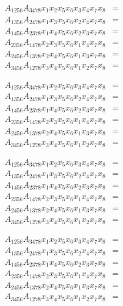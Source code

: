 \documentclass[aps, preprint]{revtex4}
\begin{document}
\begin{enumerate}
\begin{align}A_{1 2 5 6} A_{3 4 7 8} x_{1} x_{2} x_{5} x_{6} x_{3} x_{4} x_{7} x_{8} &  = \\
A_{1 3 5 6} A_{2 4 7 8} x_{1} x_{3} x_{5} x_{6} x_{2} x_{4} x_{7} x_{8} &  = \\
A_{1 4 5 6} A_{2 3 7 8} x_{1} x_{4} x_{5} x_{6} x_{2} x_{3} x_{7} x_{8} &  = \\
A_{2 3 5 6} A_{1 4 7 8} x_{2} x_{3} x_{5} x_{6} x_{1} x_{4} x_{7} x_{8} &  = \\
A_{2 4 5 6} A_{1 3 7 8} x_{2} x_{4} x_{5} x_{6} x_{1} x_{3} x_{7} x_{8} &  = \\
A_{3 4 5 6} A_{1 2 7 8} x_{3} x_{4} x_{5} x_{6} x_{1} x_{2} x_{7} x_{8} &  =\end{align}


\begin{align}A_{1 2 5 6} A_{3 4 7 8} x_{1} x_{2} x_{5} x_{6} x_{3} x_{4} x_{7} x_{8} &  = \\
A_{1 3 5 6} A_{2 4 7 8} x_{1} x_{3} x_{5} x_{6} x_{2} x_{4} x_{7} x_{8} &  = \\
A_{1 4 5 6} A_{2 3 7 8} x_{1} x_{4} x_{5} x_{6} x_{2} x_{3} x_{7} x_{8} &  = \\
A_{2 3 5 6} A_{1 4 7 8} x_{2} x_{3} x_{5} x_{6} x_{1} x_{4} x_{7} x_{8} &  = \\
A_{2 4 5 6} A_{1 3 7 8} x_{2} x_{4} x_{5} x_{6} x_{1} x_{3} x_{7} x_{8} &  = \\
A_{3 4 5 6} A_{1 2 7 8} x_{3} x_{4} x_{5} x_{6} x_{1} x_{2} x_{7} x_{8} &  =\end{align}


\begin{align}A_{1 2 5 6} A_{3 4 7 8} x_{1} x_{2} x_{5} x_{6} x_{3} x_{4} x_{7} x_{8} &  = \\
A_{1 3 5 6} A_{2 4 7 8} x_{1} x_{3} x_{5} x_{6} x_{2} x_{4} x_{7} x_{8} &  = \\
A_{1 4 5 6} A_{2 3 7 8} x_{1} x_{4} x_{5} x_{6} x_{2} x_{3} x_{7} x_{8} &  = \\
A_{2 3 5 6} A_{1 4 7 8} x_{2} x_{3} x_{5} x_{6} x_{1} x_{4} x_{7} x_{8} &  = \\
A_{2 4 5 6} A_{1 3 7 8} x_{2} x_{4} x_{5} x_{6} x_{1} x_{3} x_{7} x_{8} &  = \\
A_{3 4 5 6} A_{1 2 7 8} x_{3} x_{4} x_{5} x_{6} x_{1} x_{2} x_{7} x_{8} &  =\end{align}


\begin{align}A_{1 2 5 6} A_{3 4 7 8} x_{1} x_{2} x_{5} x_{6} x_{3} x_{4} x_{7} x_{8} &  = \\
A_{1 3 5 6} A_{2 4 7 8} x_{1} x_{3} x_{5} x_{6} x_{2} x_{4} x_{7} x_{8} &  = \\
A_{1 4 5 6} A_{2 3 7 8} x_{1} x_{4} x_{5} x_{6} x_{2} x_{3} x_{7} x_{8} &  = \\
A_{2 3 5 6} A_{1 4 7 8} x_{2} x_{3} x_{5} x_{6} x_{1} x_{4} x_{7} x_{8} &  = \\
A_{2 4 5 6} A_{1 3 7 8} x_{2} x_{4} x_{5} x_{6} x_{1} x_{3} x_{7} x_{8} &  = \\
A_{3 4 5 6} A_{1 2 7 8} x_{3} x_{4} x_{5} x_{6} x_{1} x_{2} x_{7} x_{8} &  =\end{align}


\end{enumerate}
\end{document}
